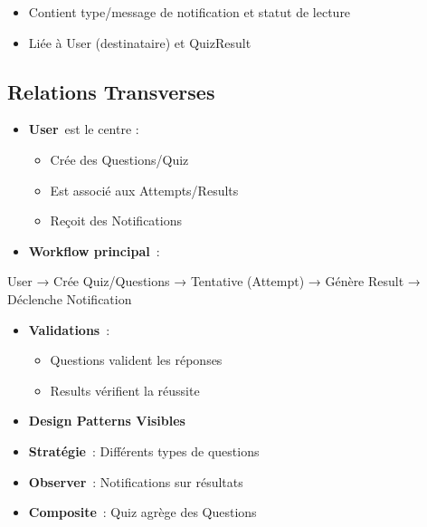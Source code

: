 \documentclass[12pt,a4paper,twoside]{report}
\begin{document}
\begin{itemize}
\item
  Contient type/message de notification et statut de lecture
\item
  Liée à User (destinataire) et QuizResult
\end{itemize}

\hypertarget{relations-transverses}{%
\subsection{Relations Transverses}\label{relations-transverses}}

\begin{itemize}
\item
  \textbf{User}~est le centre :

  \begin{itemize}
  \item
    Crée des Questions/Quiz
  \item
    Est associé aux Attempts/Results
  \item
    Reçoit des Notifications
  \end{itemize}
\end{itemize}

\begin{itemize}
\item
  \textbf{Workflow principal}~:
\end{itemize}

User → Crée Quiz/Questions → Tentative (Attempt) → Génère Result →
Déclenche Notification

\begin{itemize}
\item
  \textbf{Validations}~:

  \begin{itemize}
  \item
    Questions valident les réponses
  \item
    Results vérifient la réussite
  \end{itemize}
\end{itemize}

\begin{itemize}
\item
  \textbf{Design Patterns Visibles}
\end{itemize}

\begin{itemize}
\item
  \textbf{Stratégie}~: Différents types de questions
\item
  \textbf{Observer}~: Notifications sur résultats
\item
  \textbf{Composite}~: Quiz agrège des Questions
\end{itemize}
\end{document}
